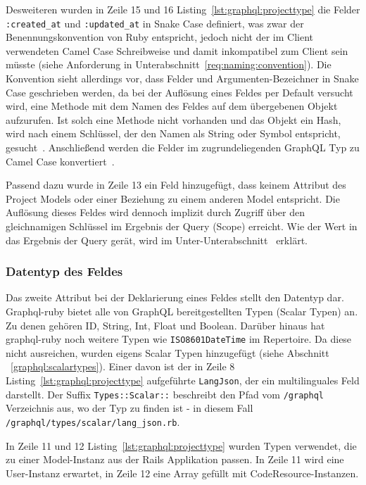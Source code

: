 Desweiteren wurden in Zeile 15 und 16 Listing~\ref{lst:graphql:projecttype} die Felder \texttt{:created\_at} und \texttt{:updated\_at} in Snake Case definiert, was zwar der Benennungskonvention von Ruby entspricht, jedoch nicht der im Client verwendeten Camel Case Schreibweise und damit inkompatibel zum Client sein müsste (siehe Anforderung in Unterabschnitt~\ref{req:naming:convention}). Die Konvention sieht allerdings vor, dass Felder und Argumenten-Bezeichner in Snake Case geschrieben werden, da bei der Auflösung eines Feldes per Default versucht wird, eine Methode mit dem Namen des Feldes auf dem übergebenen Objekt aufzurufen.
Ist solch eine Methode nicht vorhanden und das Objekt ein Hash, wird nach einem Schlüssel, der den Namen als String oder Symbol entspricht, gesucht~\cite{graphql-field-resolution}. Anschließend werden die Felder im zugrundeliegenden GraphQL Typ zu Camel Case konvertiert~\cite{graphql-object-classes}.

Passend dazu wurde in Zeile 13 ein Feld hinzugefügt, dass keinem Attribut des Project Models oder einer Beziehung zu einem anderen Model entspricht. Die Auflösung dieses Feldes wird dennoch implizit durch Zugriff über den gleichnamigen Schlüssel im Ergebnis der Query (Scope) erreicht. Wie der Wert in das Ergebnis der Query gerät, wird im Unter-Unterabschnitt~ erklärt.

\subsubsection{Datentyp des Feldes}
Das zweite Attribut bei der Deklarierung eines Feldes stellt den Datentyp dar. Graphql-ruby bietet alle von GraphQL bereitgestellten Typen (Scalar Typen) an. Zu denen gehören ID, String, Int, Float und Boolean. Darüber hinaus hat graphql-ruby noch weitere Typen wie \texttt{ISO8601DateTime} im Repertoire. Da diese nicht ausreichen, wurden eigens Scalar Typen hinzugefügt (siehe Abschnitt ~\ref{graphql:scalartypes}). Einer davon ist der in Zeile 8 Listing~\ref{lst:graphql:projecttype} aufgeführte \texttt{LangJson}, der ein multilinguales Feld darstellt. Der Suffix \texttt{Types::Scalar::} beschreibt den Pfad vom \texttt{/graphql} Verzeichnis aus, wo der Typ zu finden ist - in diesem Fall \lstinline|/graphql/types/scalar/lang_json.rb|.

In Zeile 11 und 12 Listing~\ref{lst:graphql:projecttype} wurden Typen verwendet, die zu einer Model-Instanz aus der Rails Applikation passen. In Zeile 11 wird eine User-Instanz erwartet, in Zeile 12 eine Array gefüllt mit CodeResource-Instanzen.

